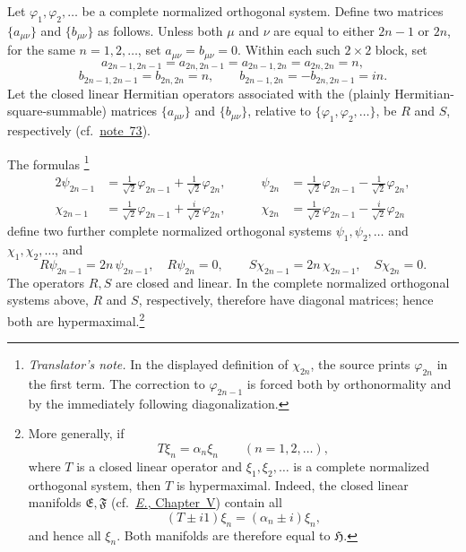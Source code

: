 \documentclass[
  paper=b5,
  twoside=true,
  fontsize=13pt,
  headings=normal,
  bookmarkpackage=false
]{scrartcl}
\theoremstyle{definition}
\newcommand{\NoteRef}[1]{\hyperref[fn:#1]{note~#1}}
\newcommand{\ErefText}[1]{\href{https://doi.org/10.1007/BF01782338}{#1}}
\newcounter{translatornote}
\newcounter{savedfootnote}
\newcommand{\TranslatorNote}[1]{%
  \stepcounter{translatornote}%
  \setcounter{savedfootnote}{\value{footnote}}%
  \begingroup
    \renewcommand{\thefootnote}{T\arabic{translatornote}}%
    \footnote{\textit{Translator's note.} #1}%
  \endgroup
  \setcounter{footnote}{\value{savedfootnote}}}
\begin{document}
Let \(\varphi_{1},\varphi_{2},\ldots\) be a complete normalized
orthogonal system.  Define two matrices \(\{a_{\mu\nu}\}\) and
\(\{b_{\mu\nu}\}\) as follows.  Unless both \(\mu\) and \(\nu\) are equal
to either \(2n-1\) or \(2n\), for the same \(n=1,2,\ldots\), set \(a_{\mu\nu}=b_{\mu\nu}=0\). Within
each such \(2\times2\) block, set
\[
  a_{2n-1,2n-1}
  =
  a_{2n,2n-1}
  =
  a_{2n-1,2n}
  =
  a_{2n,2n}
  =
  n,
\]
\[
  b_{2n-1,2n-1}=b_{2n,2n}=n,
  \qquad
  b_{2n-1,2n}=-b_{2n,2n-1}=in.
\]
Let the closed linear Hermitian operators associated with the
(plainly Hermitian-square-summable) matrices
\(\{a_{\mu\nu}\}\) and \(\{b_{\mu\nu}\}\), relative to
\(\{\varphi_{1},\varphi_{2},\ldots\}\), be \(R\) and \(S\), respectively
(cf.\ \NoteRef{73}).

The formulas\TranslatorNote{In the displayed definition of \(\chi_{2n}\),
the source prints \(\varphi_{2n}\) in the first term.  The correction to
\(\varphi_{2n-1}\) is forced both by orthonormality and by the immediately
following diagonalization.}
\begin{alignat*}{2}
  \psi_{2n-1}
  &=
  \frac{1}{\sqrt2}\varphi_{2n-1}
  +
  \frac{1}{\sqrt2}\varphi_{2n},
  &\qquad \psi_{2n}
  &=
  \frac{1}{\sqrt2}\varphi_{2n-1}
  -
  \frac{1}{\sqrt2}\varphi_{2n},\\
  \chi_{2n-1}
  &=
  \frac{1}{\sqrt2}\varphi_{2n-1}
  +
  \frac{i}{\sqrt2}\varphi_{2n},
  &\qquad \chi_{2n}
  &=
  \frac{1}{\sqrt2}\varphi_{2n-1}
  -
  \frac{i}{\sqrt2}\varphi_{2n}
\end{alignat*}
define two further complete normalized orthogonal systems
\(\psi_{1},\psi_{2},\ldots\) and
\(\chi_{1},\chi_{2},\ldots\), and
\[
  R\psi_{2n-1}=2n\,\psi_{2n-1},
  \quad
  R\psi_{2n}=0,
  \qquad
  S\chi_{2n-1}=2n\,\chi_{2n-1},
  \quad
  S\chi_{2n}=0.
\]
The operators \(R,S\) are closed and linear.  In the complete normalized
orthogonal systems above, \(R\) and \(S\), respectively, therefore have
diagonal matrices; hence both are hypermaximal.\footnote{\label{fn:74}More generally,
if
\[
  T\xi_n=\alpha_n\xi_n
  \qquad(n=1,2,\ldots),
\]
where \(T\) is a closed linear operator and
\(\xi_1,\xi_2,\ldots\) is a complete normalized orthogonal system, then
\(T\) is hypermaximal.  Indeed, the closed linear manifolds
\(\mathfrak E,\mathfrak F\) (cf.\ \ErefText{\emph{E.}, Chapter~V}) contain all
\[
  (T\pm i1)\xi_n=(\alpha_n\pm i)\xi_n,
\]
and hence all \(\xi_n\).  Both manifolds are therefore equal to
\(\mathfrak H\).}
\end{document}
